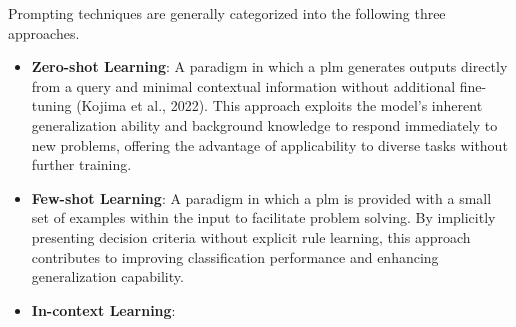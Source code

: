 \documentclass[a4paper,fleqn]{cas-sc}
\begin{document}
Prompting techniques are generally categorized into the following three approaches.
\begin{itemize}
    \item{\textbf{Zero-shot Learning}:
    A paradigm in which a \gls{plm} generates outputs directly from a query and minimal contextual information without additional fine-tuning (Kojima et al., 2022). This approach exploits the model's inherent generalization ability and background knowledge to respond immediately to new problems, offering the advantage of applicability to diverse tasks without further training.}
    \item{\textbf{Few-shot Learning}:
    A paradigm in which a \gls{plm} is provided with a small set of examples within the input to facilitate problem solving. By implicitly presenting decision criteria without explicit rule learning, this approach contributes to improving classification performance and enhancing generalization capability.}
    \item{\textbf{In-context Learning}:
}
\end{itemize}
\end{document}
